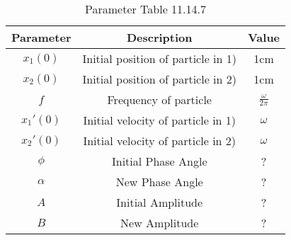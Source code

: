 
\begin{table}[h]
  \centering
  \begin{tabular}{|c|c|c|}
    \hline
Parameter & Description & Value \\ \hline
$x_1(0)$ & Initial position of particle in 1)& 1cm\\ \hline
$x_2(0)$ & Initial position of particle in 2)  & 1cm\\ \hline
$f$ & Frequency of particle & $\frac{\omega}{2\pi}$ \\ \hline
$x_1'(0)$ & Initial velocity of particle in 1) & $\omega$ \\ \hline
$x_2'(0)$ & Initial velocity of particle in 2)& $\omega$ \\ \hline
$\phi$ & Initial Phase Angle & ?\\
\hline
$\alpha$ & New Phase Angle & ?\\
\hline
$A$ & Initial Amplitude & ?\\
\hline
$B$ & New Amplitude & ?\\
\hline
  \end{tabular}
  \vspace{2mm}
  \caption{Parameter Table 11.14.7}
\end{table}


